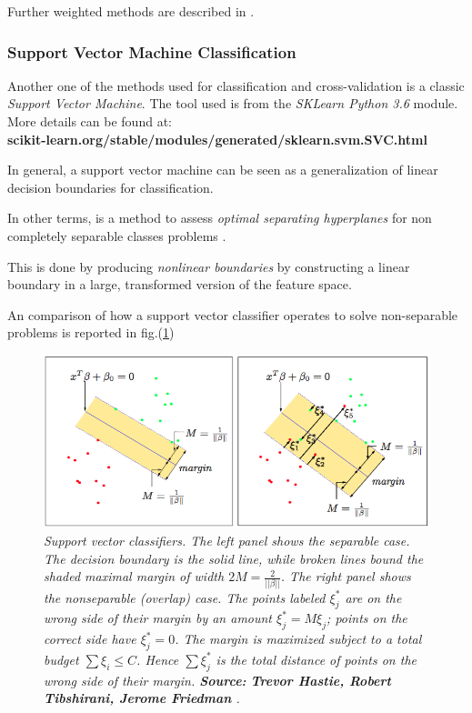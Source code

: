 \documentclass[12pt,openright,twoside,a4paper]{book}
\begin{document}
Further weighted methods are described in \cite{cluster2}.

\subsubsection*{Support Vector Machine Classification}

Another one of the methods used for classification and cross-validation is a classic \textit{Support Vector Machine}. The tool used is from the \textit{SKLearn Python 3.6} module.
More details can be found at:\\
 \textbf{scikit-learn.org/stable/modules/generated/sklearn.svm.SVC.html}
 
In general, a support vector machine can be seen as a generalization of linear decision boundaries for classification. 

In other terms, is a method to assess \textit{optimal separating hyperplanes} for non completely separable classes problems \cite{ESL}.
\vspace{5mm}

This is done by producing \textit{nonlinear boundaries} by constructing a linear boundary in a large, transformed version of the feature space.

An comparison of how a support vector classifier operates to solve non-separable problems is reported in fig.(\ref{svmc})
\clearpage

\begin{figure}[!h]
\centering
\includegraphics[scale=0.55]{svmc}
\caption{\textit{Support vector classifiers. The left panel shows the separable case. The decision boundary is the solid line, while broken lines bound the shaded maximal margin of width $2M=\frac{2}{||\beta ||}$.  The right panel shows the nonseparable (overlap) case. The points labeled $\xi^{\ast}_j$ are on the wrong side of their margin by an amount $\xi^{\ast}_j=M\xi_j$; points on the correct side have $\xi^{\ast}_j=0$. The margin is maximized subject to a total budget $\sum\xi_i\leq C$. Hence $\sum \xi^{\ast}_j$ is the total distance of points on the wrong side of their margin. \textbf{Source:} \textbf{Trevor Hastie, Robert Tibshirani, Jerome Friedman} \cite{ESL}. }}
\label{svmc}
\end{figure}
\end{document}

